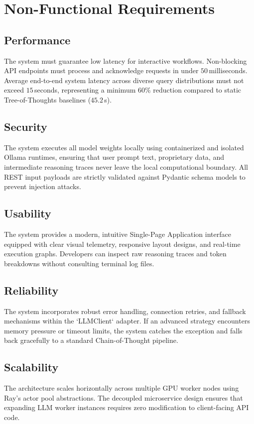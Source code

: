 \documentclass[12pt,a4paper]{report}
\begin{document}
\section{Non-Functional Requirements}
\label{sec:non_functional_requirements}

\subsection{Performance}
The system must guarantee low latency for interactive workflows. Non-blocking API endpoints must process and acknowledge requests in under $50$\,milliseconds. Average end-to-end system latency across diverse query distributions must not exceed $15$\,seconds, representing a minimum $60\%$ reduction compared to static Tree-of-Thoughts baselines ($45.2$\,s).

\subsection{Security}
The system executes all model weights locally using containerized and isolated Ollama runtimes, ensuring that user prompt text, proprietary data, and intermediate reasoning traces never leave the local computational boundary. All REST input payloads are strictly validated against Pydantic schema models to prevent injection attacks.

\subsection{Usability}
The system provides a modern, intuitive Single-Page Application interface equipped with clear visual telemetry, responsive layout designs, and real-time execution graphs. Developers can inspect raw reasoning traces and token breakdowns without consulting terminal log files.

\subsection{Reliability}
The system incorporates robust error handling, connection retries, and fallback mechanisms within the `LLMClient` adapter. If an advanced strategy encounters memory pressure or timeout limits, the system catches the exception and falls back gracefully to a standard Chain-of-Thought pipeline.

\subsection{Scalability}
The architecture scales horizontally across multiple GPU worker nodes using Ray's actor pool abstractions. The decoupled microservice design ensures that expanding LLM worker instances requires zero modification to client-facing API code.
\end{document}
